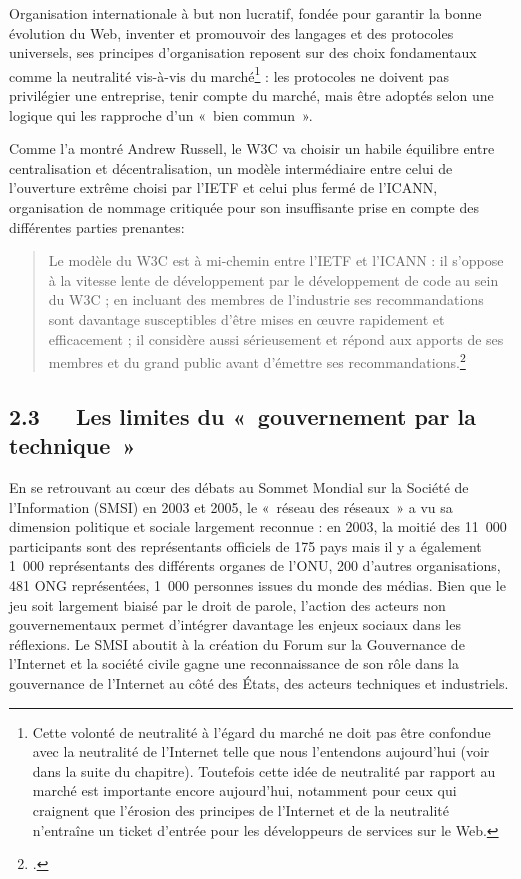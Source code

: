 \documentclass{FramateX}
\begin{document}
\begin{refsection}
Organisation internationale à but non lucratif, fondée pour garantir la
bonne évolution du Web, inventer et promouvoir des langages et des
protocoles universels, ses principes d'organisation
reposent sur des choix fondamentaux comme la neutralité vis-à-vis du
marché\footnote{Cette volonté de neutralité à l'égard
du marché ne doit pas être confondue avec la neutralité de
l'Internet telle que nous l'entendons
aujourd'hui (voir dans la suite du chapitre).
Toutefois cette idée de neutralité par rapport au marché est importante
encore aujourd'hui, notamment pour ceux qui craignent
que l'érosion des principes de
l'Internet et de la neutralité
n'entraîne un ticket d'entrée pour
les développeurs de services sur le Web.} : les protocoles ne doivent
pas privilégier une entreprise, tenir compte du marché, mais être
adoptés selon une logique qui les rapproche d'un
«~bien commun~». 

Comme l'a montré Andrew Russell, le W3C va choisir un
habile équilibre entre centralisation et décentralisation, un modèle
intermédiaire entre celui de l'ouverture extrême
choisi par l'IETF et celui plus fermé de
l'ICANN, organisation de nommage critiquée pour son
insuffisante prise en compte des différentes parties prenantes:

\begin{quote}
Le modèle du W3C est à mi-chemin entre l'IETF et
l'ICANN : il s'oppose à la vitesse
lente de développement par le développement de code au sein du W3C ; en
incluant des membres de l'industrie ses
recommandations sont davantage susceptibles d'être
mises en œuvre rapidement et efficacement ; il considère aussi
sérieusement et répond aux apports de ses membres et du grand public
avant d'émettre ses
recommandations.\footnote{\cite{Russell2011}.}
\end{quote}

\subsection*{2.3~~~Les limites du «~gouvernement par la technique~»}
{}

En se retrouvant au cœur des débats au Sommet Mondial sur la Société de
l'Information (SMSI) en 2003 et 2005, le «~réseau des
réseaux~» a vu sa dimension politique et sociale largement reconnue :
en 2003, la moitié des 11~000 participants sont des représentants
officiels de 175 pays mais il y a également 1~000 représentants des
différents organes de l'ONU, 200
d'autres organisations, 481 ONG représentées, 1~000
personnes issues du monde des médias. Bien que le jeu soit largement
biaisé par le droit de parole, l'action des acteurs
non gouvernementaux permet d'intégrer davantage les
enjeux sociaux dans les réflexions. Le SMSI aboutit à la création du
Forum sur la Gouvernance de l'Internet et la société
civile gagne une reconnaissance de son rôle dans la gouvernance de
l'Internet au côté des États, des acteurs techniques
et industriels. 


\end{refsection}
\end{document}
